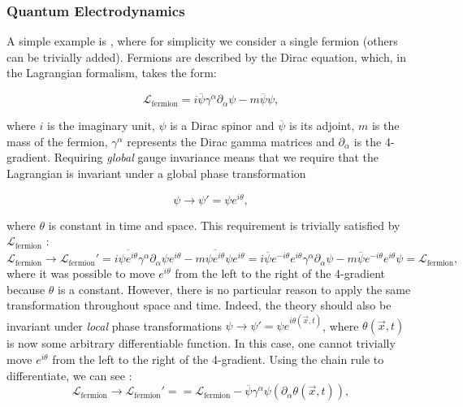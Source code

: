 \subsubsection{Quantum Electrodynamics}
A simple example is \QED, where for simplicity we consider a single fermion (others can be trivially added). Fermions are described by the Dirac equation, which, in the Lagrangian formalism, takes the form:

\begin{equation}
\label{eq:th:dirac}
\mathcal{L}_{\textrm{fermion}} = i\overline{\psi} \gamma^{\alpha} \partial_{\alpha} \psi - m\overline{\psi}\psi,
\end{equation}

where $i$ is the imaginary unit, $\psi$ is a Dirac spinor and $\overline{\psi}$ is its adjoint, $m$ is the mass of the fermion, $\gamma^{\alpha}$ represents the Dirac gamma matrices and $\partial_{\alpha}$ is the 4-gradient. 
Requiring \emph{global} gauge invariance means that we require that the Lagrangian is invariant under a global phase transformation

\begin{equation}
\label{eq:th:local_gauge_transform}
\psi \rightarrow \psi'= \psi e^{i\theta},
\end{equation}

where $\theta$ is constant in time and space. This requirement is trivially satisfied by $\mathcal{L}_{\textrm{fermion}}$ :
$$
\mathcal{L}_{\textrm{fermion}} \rightarrow \mathcal{L}_{\textrm{fermion}}'=i\overline{\psi e^{i\theta}} \gamma^{\alpha} \partial_{\alpha} \psi e^{i\theta} - m\overline{\psi e^{i\theta}}\psi e^{i\theta}  =i \overline{\psi } e^{-i\theta} e^{i\theta}\gamma^{\alpha} \partial_{\alpha} \psi - m\overline{\psi} e^{-i\theta} e^{i\theta}\psi  = \mathcal{L}_{\textrm{fermion}},
$$
where it was possible to move $e^{i\theta}$ from the left to the right of the 4-gradient because $\theta$ is a constant. However, there is no particular reason to apply the same transformation throughout space and time. Indeed, the theory should also be invariant under \emph{local} phase transformations $\psi \rightarrow \psi'= \psi e^{i\theta(\vec{x},t)}$, where $\theta(\vec{x},t)$ is now some arbitrary differentiable function.
In this case, one cannot trivially move $e^{i\theta}$ from the left to the right of the 4-gradient. Using the chain rule to differentiate, we can see :
\begin{equation}
\label{eq:th:dirac_lagrangian_not_invariant_local_gauge_transf}
\mathcal{L}_{\textrm{fermion}} \rightarrow \mathcal{L}_{\textrm{fermion}}'=  = \mathcal{L}_{\textrm{fermion}} - \overline{\psi} \gamma^{\alpha} \psi (\partial_{\alpha} \theta(\vec{x},t)),
\end{equation}

